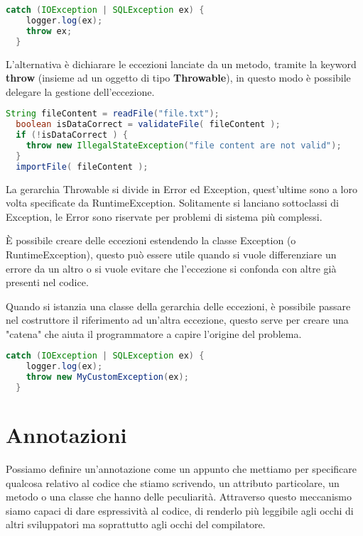 \documentclass[a4paper,12pt,twoside]{book}
\begin{document}
\begin{lstlisting}[caption={}, label={lst:multi}, language=Java]
  catch (IOException | SQLException ex) {
    logger.log(ex);
    throw ex;
  }
\end{lstlisting}

L’alternativa è dichiarare le eccezioni lanciate da un metodo, tramite
la keyword \textbf{throw} (insieme ad un oggetto di tipo
\textbf{Throwable}), in questo modo è possibile delegare la gestione
dell’eccezione.

\begin{lstlisting}[caption={}, label={lst:multi2}, language=Java]
  String fileContent = readFile("file.txt");
  boolean isDataCorrect = validateFile( fileContent );
  if (!isDataCorrect ) {
    throw new IllegalStateException("file content are not valid");
  }
  importFile( fileContent );
\end{lstlisting}

La gerarchia Throwable si divide in Error ed Exception, quest’ultime
sono a loro volta specificate da RuntimeException. Solitamente si
lanciano sottoclassi di Exception, le Error sono riservate per
problemi di sistema più complessi.  

È possibile creare delle eccezioni estendendo la classe Exception (o
RuntimeException), questo può essere utile quando si vuole
differenziare un errore da un altro o si vuole evitare che l’eccezione
si confonda con altre già presenti nel codice.

Quando si istanzia una classe della gerarchia delle eccezioni, è
possibile passare nel costruttore il riferimento ad un’altra
eccezione, questo serve per creare una "catena" che aiuta il
programmatore a capire l’origine del problema.

\begin{lstlisting}[caption={}, label={lst:exception}, language=Java]
  catch (IOException | SQLException ex) {
    logger.log(ex);
    throw new MyCustomException(ex);
  }
\end{lstlisting}

\section{Annotazioni}

Possiamo definire un'annotazione come un appunto che mettiamo per
specificare qualcosa relativo al codice che stiamo scrivendo, un
attributo particolare, un metodo o una classe che hanno delle
peculiarità. Attraverso questo meccanismo siamo capaci di dare
espressività al codice, di renderlo più leggibile agli occhi di altri
sviluppatori ma soprattutto agli occhi del compilatore.
\end{document}
